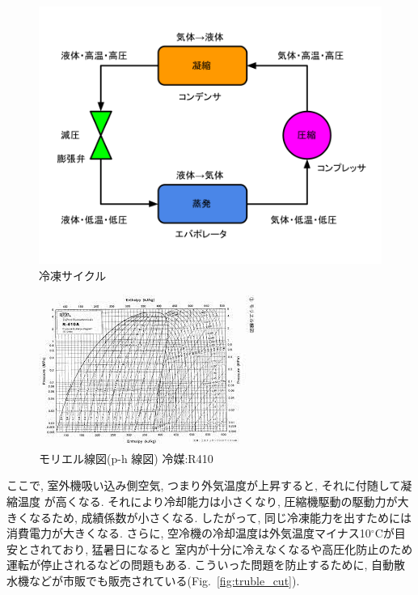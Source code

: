 \documentclass[a4j,fleqn,dvipdfmx,uplatex]{jsarticle}
\newcommand{\figref}[1]{Fig.\ \ref{#1}}
\begin{document}
\begin{figure}[htb]
  \centering
      \includegraphics[width=0.8\linewidth]{img/cycle-2.png}
      \caption{冷凍サイクル}
      \label{fig1:cycle}
\end{figure}

\begin{figure}[htb]
    \centering
        \includegraphics[width=\linewidth]{img/ph線図.jpg}
        \caption{モリエル線図(p-h 線図) 冷媒:R410}
        \label{fig1:ph_r410}
\end{figure}

ここで, 室外機吸い込み側空気, つまり外気温度が上昇すると, それに付随して凝縮温度
が高くなる. それにより冷却能力は小さくなり, 圧縮機駆動の駆動力が大きくなるため, 
成績係数が小さくなる. したがって, 同じ冷凍能力を出すためには消費電力が大きくなる.  
さらに, 空冷機の冷却温度は外気温度マイナス10$^\circ$Cが目安とされており, 猛暑日になると
室内が十分に冷えなくなるや高圧化防止のため運転が停止されるなどの問題もある. 
こういった問題を防止するために, 自動散水機などが市販でも販売されている(\figref{fig:truble_cut}). 
\end{document}
